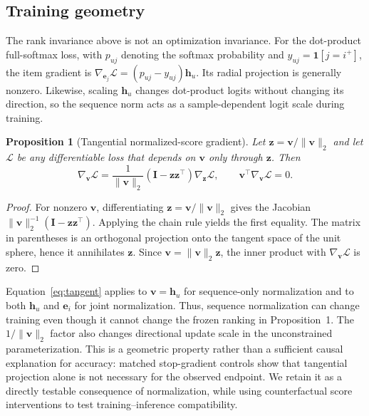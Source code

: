 \documentclass[sigconf,anonymous,review]{acmart}
\newtheorem{proposition}{Proposition}
\begin{document}
\subsection{Training geometry}
The rank invariance above is not an optimization invariance. For the dot-product full-softmax loss, with $p_{uj}$ denoting the softmax probability and $y_{uj}=\mathbf{1}[j=i^+]$, the item gradient is $\nabla_{\bm e_j}\mathcal L=(p_{uj}-y_{uj})\bm h_u$. Its radial projection is generally nonzero. Likewise, scaling $\bm h_u$ changes dot-product logits without changing its direction, so the sequence norm acts as a sample-dependent logit scale during training.
\begin{proposition}[Tangential normalized-score gradient]
Let $\bm z=\bm v/\|\bm v\|_2$ and let $\mathcal L$ be any differentiable loss that depends on $\bm v$ only through $\bm z$. Then
\begin{equation}
\nabla_{\bm v}\mathcal L=\frac{1}{\|\bm v\|_2}\left(\bm I-\bm z\bm z^\top\right)\nabla_{\bm z}\mathcal L,
\qquad \bm v^\top\nabla_{\bm v}\mathcal L=0.\label{eq:tangent}
\end{equation}
\end{proposition}
\begin{proof}For nonzero $\bm v$, differentiating $\bm z=\bm v/\|\bm v\|_2$ gives the Jacobian $\|\bm v\|_2^{-1}(\bm I-\bm z\bm z^\top)$. Applying the chain rule yields the first equality. The matrix in parentheses is an orthogonal projection onto the tangent space of the unit sphere, hence it annihilates $\bm z$. Since $\bm v=\|\bm v\|_2\bm z$, the inner product with $\nabla_{\bm v}\mathcal L$ is zero.\end{proof}
Equation~\ref{eq:tangent} applies to $\bm v=\bm h_u$ for sequence-only normalization and to both $\bm h_u$ and $\bm e_i$ for joint normalization. Thus, sequence normalization can change training even though it cannot change the frozen ranking in Proposition~1. The $1/\|\bm v\|_2$ factor also changes directional update scale in the unconstrained parameterization. This is a geometric property rather than a sufficient causal explanation for accuracy: matched stop-gradient controls show that tangential projection alone is not necessary for the observed endpoint. We retain it as a directly testable consequence of normalization, while using counterfactual score interventions to test training--inference compatibility.
\end{document}
